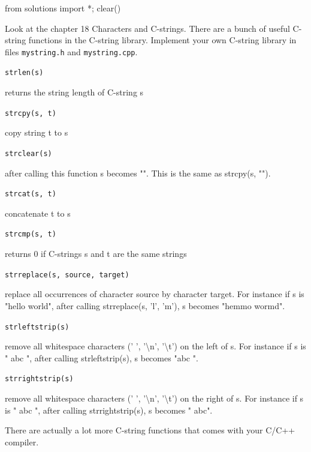 \begin{python0}
from solutions import *; clear()
\end{python0}

Look at the chapter 18 Characters and C-strings. There are a bunch of
useful C-string functions in the C-string library. Implement your own
C-string library in files \texttt{mystring.h} and \texttt{mystring.cpp}.

\texttt{strlen(s)}

returns the string length of C-string s

\texttt{strcpy(s, t)}

copy string t to s

\texttt{strclear(s)}

after calling this function s becomes "". This is the same as strcpy(s,
"").

\texttt{strcat(s, t)}

concatenate t to s

\texttt{strcmp(s, t)}

returns 0 if C-strings s and t are the same strings

\texttt{strreplace(s, source, target)}

replace all occurrences of character source by character target. For
instance if s is "hello world", after calling strreplace(s,
'l', 'm'),
s becomes "hemmo wormd".

\texttt{strleftstrip(s)}

remove all whitespace characters (' ',
'\textbackslash n',
'\textbackslash t') on the left of s. For
instance if s is " abc ", after calling strleftstrip(s), s becomes "abc
".

\texttt{strrightstrip(s)}

remove all whitespace characters (' ',
'\textbackslash n',
'\textbackslash t') on the right of s. For
instance if s is " abc ", after calling strrightstrip(s), s becomes "
abc".

There are actually a lot more C-string functions that comes with your
C/C++ compiler.

